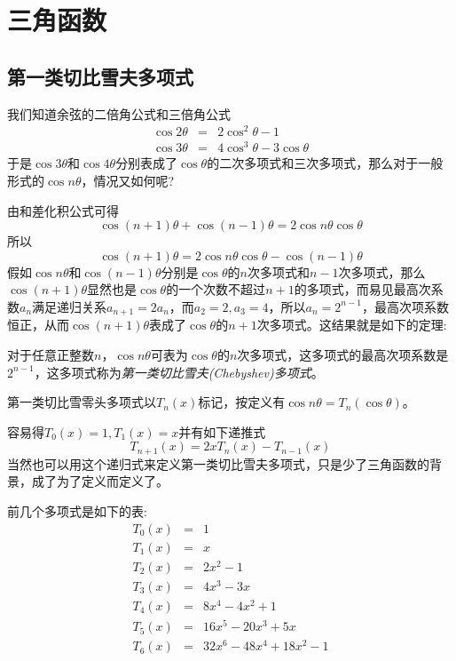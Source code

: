 
\section{三角函数}
\label{sec:triangle-function}

\subsection{第一类切比雪夫多项式}
\label{sec:first-chebyshev-polynome}

我们知道余弦的二倍角公式和三倍角公式
\begin{eqnarray*}
  \cos{2\theta} & = & 2\cos^2{\theta}-1 \\
  \cos{3\theta} & = & 4\cos^3{\theta}-3\cos{\theta}
\end{eqnarray*}
于是$\cos{3\theta}$和$\cos{4\theta}$分别表成了$\cos{\theta}$的二次多项式和三次多项式，那么对于一般形式的$\cos{n\theta}$，情况又如何呢?

由和差化积公式可得
\[ \cos{(n+1)\theta}+\cos{(n-1)\theta}=2\cos{n\theta}\cos{\theta} \]
所以
\[ \cos{(n+1)\theta}=2\cos{n\theta}\cos{\theta}-\cos{(n-1)\theta} \]
假如$\cos{n\theta}$和$\cos{(n-1)\theta}$分别是$\cos{\theta}$的$n$次多项式和$n-1$次多项式，那么$\cos{(n+1)\theta}$显然也是$\cos{\theta}$的一个次数不超过$n+1$的多项式，而易见最高次系数$a_n$满足递归关系$a_{n+1}=2a_n$，而$a_2=2,a_3=4$，所以$a_n=2^{n-1}$，最高次项系数恒正，从而$\cos{(n+1)\theta}$表成了$\cos{\theta}$的$n+1$次多项式。这结果就是如下的定理:

\begin{theorem}
  对于任意正整数$n$，$\cos{n\theta}$可表为$\cos{\theta}$的$n$次多项式，这多项式的最高次项系数是$2^{n-1}$，这多项式称为\emph{第一类切比雪夫(Chebyshev)多项式}。
\end{theorem}

第一类切比雪零头多项式以$T_n(x)$标记，按定义有$\cos{n\theta}=T_n(\cos{\theta})$。

容易得$T_0(x)=1,T_1(x)=x$并有如下递推式
\begin{equation}
  \label{eq:first-chebyshev-polynome-recursion}
  T_{n+1}(x)=2xT_n(x)-T_{n-1}(x)
\end{equation}
当然也可以用这个递归式来定义第一类切比雪夫多项式，只是少了三角函数的背景，成了为了定义而定义了。

前几个多项式是如下的表:
\begin{eqnarray*}
  T_0(x) & = & 1 \\
  T_1(x) & = & x \\
  T_2(x) & = & 2x^2-1 \\
  T_3(x) & = & 4x^3-3x \\
  T_4(x) & = & 8x^4-4x^2+1 \\
  T_5(x) & = & 16x^5-20x^3+5x \\
  T_6(x) & = & 32x^6-48x^4+18x^2-1
\end{eqnarray*}

